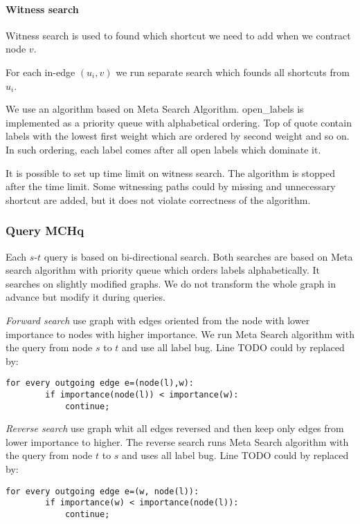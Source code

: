\paragraph*{Witness search}

Witness search is used to found which shortcut we need to add when we contract 
node $v$.

For each in-edge $(u_i,v)$ we run separate search which founds all shortcuts 
from $u_i$.

We use an algorithm based on Meta Search Algorithm. 
open\_labels 
is implemented as a priority queue with alphabetical ordering. Top of quote contain labels with the lowest first weight which are ordered by second weight and so on. 
In such ordering, each label comes after all open labels which dominate it.

It is possible to set up time limit on witness search. The algorithm is stopped after the time limit. Some witnessing paths could by missing and unnecessary shortcut are added, but it does not violate correctness of the algorithm.

\subsubsection{Query MCHq}

Each $s$-$t$ query is based on bi-directional search.
Both searches are based on Meta search algorithm with priority queue which orders labels
alphabetically. It searches on slightly modified graphs. We do not transform the whole
graph in advance but modify it during queries.

\emph{Forward search} use graph with edges
oriented from the node with lower importance to nodes with higher importance.
We run Meta Search algorithm with the query from node $s$ to $t$ and use all label bug.
Line TODO could by replaced by:

\begin{lstlisting}[caption={MCHp},label=list:8-6,captionpos=t,float,abovecaptionskip=-\medskipamount]
    for every outgoing edge e=(node(l),w):
    	if importance(node(l)) < importance(w):
        	continue;
\end{lstlisting}

\emph{Reverse search} use graph whit all edges reversed and then keep only edges
from lower importance to higher. 
The reverse search runs Meta Search algorithm with the query from node $t$ to $s$ and uses all label bug.
Line TODO could by replaced by:

\begin{lstlisting}[caption={MCHp},label=list:8-6,captionpos=t,float,abovecaptionskip=-\medskipamount]
    for every outgoing edge e=(w, node(l)):
    	if importance(w) < importance(node(l)):
        	continue;
\end{lstlisting}

